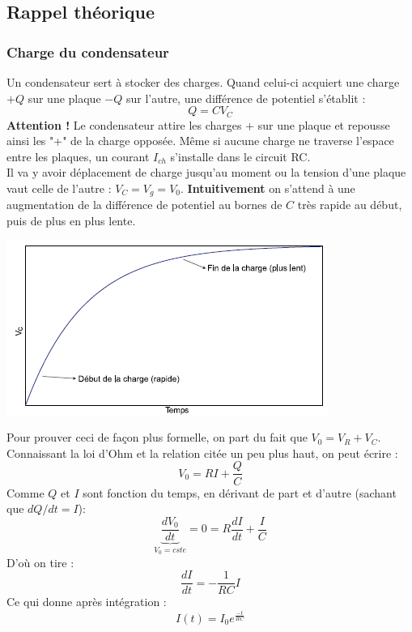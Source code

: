 \documentclass	[11pt, a4paper, openany]{book}
\begin{document}
\subsection{Rappel théorique}
\subsubsection*{Charge du condensateur}
Un condensateur sert à stocker des charges. Quand celui-ci acquiert une charge $+Q$ sur une plaque $-Q$ sur l'autre, une différence de potentiel s'établit : 
\begin{equation}
Q = CV_C
\end{equation}
\textbf{Attention !} Le condensateur attire les charges + sur une plaque et repousse ainsi les "+" de la charge opposée. Même si aucune charge ne traverse l'espace entre les plaques, un courant $I_{ch}$ s'installe dans le circuit RC.\\

Il va y avoir déplacement de charge jusqu'au moment ou la tension d'une plaque vaut celle de l'autre : $V_C = V_g = V_0$. \textbf{Intuitivement} on s'attend à une augmentation de la différence de potentiel au bornes de $C$ très rapide au début, puis de plus en plus lente.

\begin{center}
\includegraphics[scale=0.5]{labo/image13.png}
\end{center}

Pour prouver ceci de façon plus formelle, on part du fait que $V_0 = V_R + V_C$. Connaissant la loi d'Ohm et la relation citée un peu plus haut, on peut écrire :
\begin{equation}
V_0 = RI + \frac{Q}{C}
\end{equation}
Comme $Q$ et $I$ sont fonction du temps, en dérivant de part et d'autre (sachant que $dQ/dt = I$): 
\begin{equation}
\underbrace{\frac{dV_0}{dt}}_{V_0 = cste} = 0 = R\frac{dI}{dt} + \frac{I}{C}
\end{equation}
D'où on tire : 
\begin{equation}
\frac{dI}{dt} = - \frac{1}{RC}I
\end{equation}
Ce qui donne après intégration : 
\begin{equation}
I(t) = I_0e^{\frac{-t}{RC}}
\end{equation}
\end{document}

